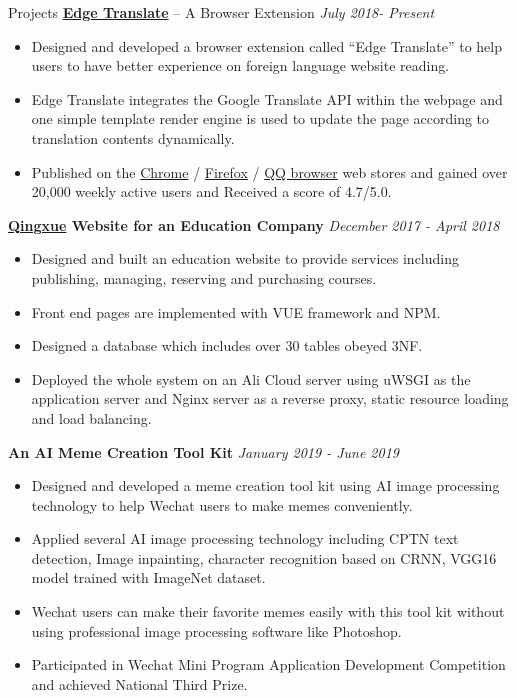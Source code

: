 \documentclass{resume} %
\begin{document}
\begin{rSection}{Projects}
{\bf  \href{https://github.com/EdgeTranslate/EdgeTranslate}{Edge Translate}}{ -- A Browser Extension} \hfill {\em July 2018- Present}
\begin{itemize}[itemsep=-0.3em]
    \item Designed and developed a browser extension called “Edge Translate” to help users to have better experience on foreign language website reading.
    \item Edge Translate integrates the Google Translate API within the webpage and one simple template render engine is used to update the page according to translation contents dynamically.
    \item Published on the \href{https://chrome.google.com/webstore/detail/edgetranslate/bocbaocobfecmglnmeaeppambideimao}{Chrome} / \href{https://addons.mozilla.org/zh-CN/firefox/addon/edge_translate/}{Firefox} / \href{https://appcenter.browser.qq.com/search/detail?key=edgetranslate&id=bocbaocobfecmglnmeaeppambideimao%20&title=edgetranslate}{QQ browser} web stores and gained over 20,000 weekly active users and Received a score of 4.7/5.0.
\end{itemize}

{\bf \href{https://github.com/Mark-Fenng/QingXueFrontEnd}{Qingxue} Website for an Education Company} \hfill {\em December 2017 -  April 2018}
\begin{itemize}[itemsep=-0.3em]
    \item Designed and built an education website to provide services including publishing, managing, reserving and purchasing courses.
    \item Front end pages are implemented with VUE framework and NPM.
    \item Designed a database which includes over 30 tables obeyed 3NF.
    \item Deployed the whole system on an Ali Cloud server using uWSGI as the application server and Nginx server as a reverse proxy, static resource loading and load balancing.
\end{itemize}

{\bf An AI Meme Creation Tool Kit} \hfill {\em January 2019 - June 2019}
\begin{itemize}[itemsep=-0.3em]
    \item Designed and developed a meme creation tool kit using AI image processing technology to help Wechat users to make memes conveniently.
    \item Applied several AI image processing technology including CPTN text detection, Image inpainting, character recognition based on CRNN, VGG16 model trained with ImageNet dataset.
    \item Wechat users can make their favorite memes easily with this tool kit without using professional image processing software like Photoshop.
    \item Participated in Wechat Mini Program Application Development Competition and achieved National Third Prize.
\end{itemize}
    

\end{rSection}
\end{document}

